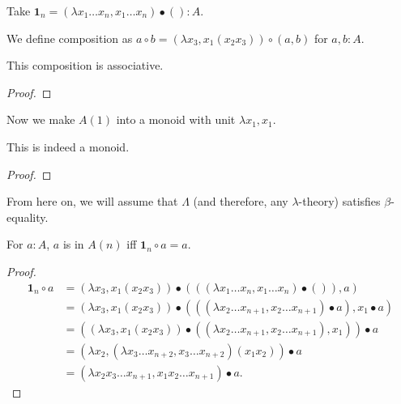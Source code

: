 \begin{definition}
  Take $ \mathbf 1_n = (\lambda x_1 \dots x_n, x_1 \dots x_n) \bullet () : A $.
\end{definition}

\begin{definition}
  We define composition as $ a \circ b = (\lambda x_3, x_1 (x_2 x_3)) \circ (a, b) $ for $ a, b : A $.
\end{definition}

\begin{lemma}
  This composition is associative.
\end{lemma}
\begin{proof}
  \TODO
\end{proof}

\begin{definition}
  Now we make $ A(1) $ into a monoid with unit $ \lambda x_1, x_1 $.
\end{definition}

\begin{lemma}
  This is indeed a monoid.
\end{lemma}
\begin{proof}
  \TODO
\end{proof}

From here on, we will assume that $ \Lambda $ (and therefore, any $ \lambda $-theory) satisfies $ \beta $-equality.

\begin{lemma}
  For $ a: A $, $ a $ is in $ A(n) $ iff $ \mathbf 1_n \circ a = a $.
\end{lemma}
\begin{proof}
  \begin{align*}
    \mathbf 1_n \circ a
    &= (\lambda x_3, x_1 (x_2 x_3)) \bullet (((\lambda x_1 \dots x_n, x_1 \dots x_n) \bullet ()), a)\\
    &= (\lambda x_3, x_1 (x_2 x_3)) \bullet (((\lambda x_2 \dots x_{n + 1}, x_2 \dots x_{n + 1}) \bullet a), x_1 \bullet a)\\
    &= ((\lambda x_3, x_1 (x_2 x_3)) \bullet ((\lambda x_2 \dots x_{n + 1}, x_2 \dots x_{n + 1}), x_1)) \bullet a\\
    &= (\lambda x_2, (\lambda x_3 \dots x_{n + 2}, x_3 \dots x_{n + 2}) (x_1 x_2)) \bullet a\\
    &= (\lambda x_2 x_3 \dots x_{n + 1}, x_1 x_2 \dots x_{n + 1}) \bullet a.
  \end{align*}
\end{proof}

